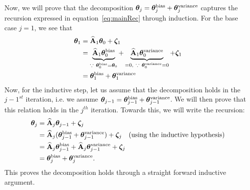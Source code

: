 Now, we will prove that the decomposition $\boldsymbol{\theta}_{j} = \boldsymbol{\theta}_{j}^{\textrm{bias}} + \boldsymbol{\theta}_{j}^{\textrm{variance}}$ captures the recursion expressed in equation~\ref{eq:mainRec} through induction. For the base case $j=1$, we see that 
\begin{align*}
\thetav_1&=\Ah_1\thetav_0+\zetav_1\\
&=\underbrace{\Ah_1\thetav_0^{\textrm{bias}}}_{\because\ \thetav_0^{\textrm{bias}}=\thetav_0}+\underbrace{\Ah_1\thetav_0^{\textrm{variance}}}_{=0 ,\ \because\ \thetav_0^{\textrm{variance}}=0}+\zetav_1\\
&=\thetav_1^{\textrm{bias}}+\thetav_1^{\textrm{variance}}
\end{align*}
Now, for the inductive step, let us assume that the decomposition holds in the $j-1^{st}$ iteration, i.e. we assume $\boldsymbol{\theta}_{j-1}=\boldsymbol{\theta}_{j-1}^{\textrm{bias}}+\boldsymbol{\theta}_{j-1}^{\textrm{variance}}$. We will then prove that this relation holds in the $j^{th}$ iteration. Towards this, we will write the recursion:
\begin{align*}
\boldsymbol{\theta}_j&=\widehat{\mathbf{A}}_j\boldsymbol{\theta}_{j-1}+\boldsymbol{\zeta}_j\\
&=\widehat{\mathbf{A}}_j(\boldsymbol{\theta}_{j-1}^{\textrm{bias}}+\boldsymbol{\theta}_{j-1}^{\textrm{variance}})+\boldsymbol{\zeta}_j\quad\text{(using the inductive hypothesis)}\\
&=\widehat{\mathbf{A}}_j\boldsymbol{\theta}_{j-1}^{\textrm{bias}}+\widehat{\mathbf{A}}_j\boldsymbol{\theta}_{j-1}^{\textrm{variance}}+\boldsymbol{\zeta}_j\\
&=\boldsymbol{\theta}_j^{\textrm{bias}}+\boldsymbol{\theta}_j^{\textrm{variance}}.
\end{align*}
This proves the decomposition holds through a straight forward inductive argument.
\iffalse
We note that $\thetat^{\textrm{bias}}$ is obtained by beginning at $\thetav_0^{\textrm{bias}}=\thetav_0$ and running the algorithm on the noiseless problem (i.e. where $\zetav_j=0$ a.s.). On the other hand, $\thetat^{\textrm{variance}}$ is obtained by beginning at the solution $\thetav^{\textrm{variance}}_0=0$, and allowing the noise $\zetav_j$ to drive the process. 
\fi

